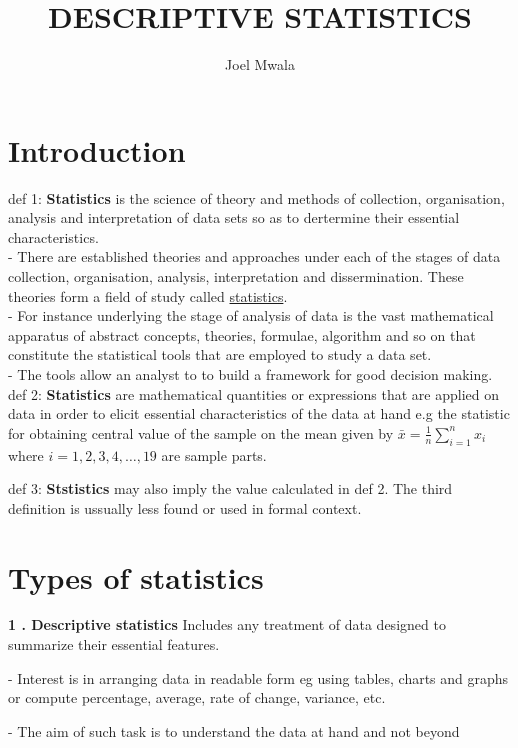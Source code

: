 \documentclass[11pt,a4paper]{article}
\title{DESCRIPTIVE STATISTICS}
\author{Joel Mwala}
\begin{document}
%
\maketitle
\section{Introduction}
\setlength{\parskip}{0.5em} %
def 1: \textbf{Statistics} is the science of theory and methods of collection, organisation, analysis and interpretation of data sets so as to dertermine their essential characteristics. \\ - There are established theories and approaches under each of the stages of data collection, organisation, analysis, interpretation and dissermination. These theories form a field of study called \underline{statistics}. \\ - For instance underlying the stage of analysis of data is the vast mathematical apparatus of abstract concepts, theories, formulae, algorithm and so on that constitute the statistical tools that are employed to study a data set. \\ - The tools allow an analyst to to build a framework for good decision making.
\newline
def 2: \textbf{Statistics} are mathematical quantities or expressions that are applied on data in order to elicit essential characteristics of the data at hand e.g the statistic for obtaining central value of the sample on the mean given by $\bar{x} = \frac{1}{n}\sum_{i = 1}^{n} x_i$ where $i = 1,2,3,4, \dots,19$ are sample parts. \

def 3: \textbf{Ststistics} may also imply the value calculated in def 2.
The third definition is ussually less found or used in formal context.

\section{Types of statistics}

\textbf{1 . Descriptive statistics} Includes any treatment of data designed to summarize their essential features.

- Interest is in arranging data in readable form eg using tables, charts and graphs or compute percentage, average, rate of change, variance, etc.

- The aim of such task is to understand the data at hand and not beyond
\end{document}
